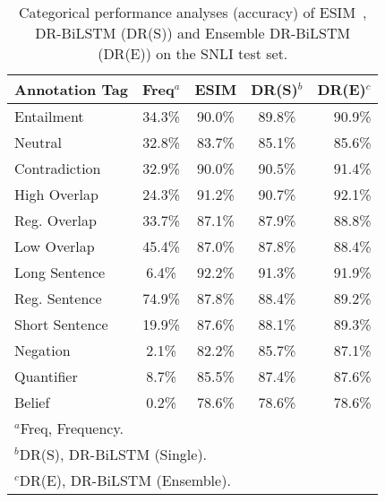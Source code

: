 \documentclass[11pt,a4paper]{article}
\begin{document}
	
	\begin{table}[t]
		\centering
		\small
		\begin{tabular}{lcccr}
			\hline
			Annotation Tag & Freq$^a$ & ESIM & DR(S)$^b$ & DR(E)$^c$ \\
			\hline \hline
			Entailment & 34.3\% & 90.0\% & 89.8\% & 90.9\% \\
			Neutral & 32.8\% & 83.7\% & 85.1\% & 85.6\% \\
			Contradiction & 32.9\% & 90.0\% & 90.5\% & 91.4\% \\ \hline
			High Overlap & 24.3\% & 91.2\% & 90.7\% & 92.1\% \\
			Reg. Overlap & 33.7\% & 87.1\% & 87.9\% & 88.8\% \\
			Low Overlap & 45.4\% & 87.0\% & 87.8\% & 88.4\% \\ \hline
			Long Sentence & 6.4\%  & 92.2\% & 91.3\% & 91.9\% \\
			Reg. Sentence & 74.9\% & 87.8\% & 88.4\% & 89.2\% \\
			Short Sentence & 19.9\% & 87.6\% & 88.1\% & 89.3\% \\ \hline
			Negation & 2.1\% & 82.2\% & 85.7\% & 87.1\% \\
			Quantifier & 8.7\% & 85.5\% & 87.4\% & 87.6\% \\
Belief & 0.2\% & 78.6\% & 78.6\% & 78.6\% \\
			\hline \hline
			\multicolumn{5}{l}{$^a$Freq, Frequency.} \\
			\multicolumn{5}{l}{$^b$DR(S), DR-BiLSTM (Single).} \\
			\multicolumn{5}{l}{$^c$DR(E), DR-BiLSTM (Ensemble).} \\ \hline
		\end{tabular}
		\caption{\label{tab:snli:deep:analz} Categorical performance analyses (accuracy) of ESIM~\cite{him2017}, DR-BiLSTM (DR(S)) and Ensemble DR-BiLSTM (DR(E)) on the SNLI test set.}
	\end{table}	
	
\end{document}
